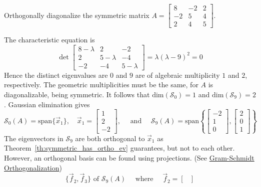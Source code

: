 \documentclass{ximera}
\begin{document}
\begin{example}\label{exa:ortho_diag_symm}
Orthogonally diagonalize the symmetric matrix $A = \begin{bmatrix}
8 & -2 & 2 \\
-2 & 5 & 4 \\
2 & 4 & 5
\end{bmatrix}$.


\begin{explanation}
  The characteristic equation is
\begin{equation*}
\det  \begin{bmatrix}
8-\lambda & 2 & -2 \\
2 & 5-\lambda & -4 \\
-2 & -4 & 5-\lambda
\end{bmatrix} = \lambda(\lambda-9)^2=0
\end{equation*}
Hence the distinct eigenvalues are $0$ and $9$ are of algebraic multiplicity $1$ and $2$, respectively.  The geometric multiplicities must be the same, for $A$ is diagonalizable, being symmetric. It follows that $\mbox{dim}(\mathcal{S}_0) = 1$ and $\mbox{dim}(\mathcal{S}_9) = 2$.  Gaussian elimination gives
\begin{equation*}
\mathcal{S}_{0}(A) = \mbox{span}\{\vec{x}_{1}\}, \quad \vec{x}_{1} = \begin{bmatrix}
1 \\
2 \\
-2
\end{bmatrix}, \quad \mbox{ and } \quad \mathcal{S}_{9}(A) = \mbox{span} \left\lbrace \begin{bmatrix}
	-2 \\
	1 \\
	0
	\end{bmatrix}, \begin{bmatrix}
2 \\
0 \\
1
\end{bmatrix} \right\rbrace
\end{equation*}
The eigenvectors in $\mathcal{S}_{9}$ are both orthogonal to $\vec{x}_{1}$ as Theorem~\ref{th:symmetric_has_ortho_ev} guarantees, but not to each other. However, an orthogonal basis can be found using projections. (See \href{https://ximera.osu.edu/corela/LinearAlgebraInteractiveIntro/RTH-0015/main}{Gram-Schmidt Orthogonalization})
\begin{equation*}
\{\vec{f}_{2}, \vec{f}_{3}\} \mbox{ of } \mathcal{S}_{9}(A) \quad \mbox{ where } \quad \vec{f}_{2} = \begin{bmatrix}

\end{bmatrix}
\end{equation*}
\end{explanation}
\end{example}
\end{document}
